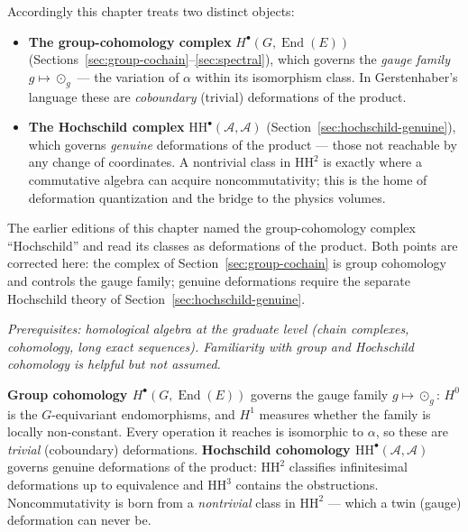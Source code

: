 \documentclass[11pt,a4paper,openany]{book}
\theoremstyle{plain}
\theoremstyle{definition}
\newcommand{\twing}[1]{\odot_{#1}}
\newcommand{\actspace}{E}
\newcommand{\groupG}{G}
\DeclareMathOperator{\End}{End}
\begin{document}
Accordingly this chapter treats two distinct objects:
\begin{itemize}
    \item \textbf{The group-cohomology complex} $H^\bullet(\groupG, \End(\actspace))$ (Sections~\ref{sec:group-cochain}--\ref{sec:spectral}), which governs the \emph{gauge family} $g \mapsto \twing{g}$ --- the variation of $\alpha$ within its isomorphism class. In Gerstenhaber's language these are \emph{coboundary} (trivial) deformations of the product.
    \item \textbf{The Hochschild complex} $\mathrm{HH}^\bullet(\mathcal{A},\mathcal{A})$ (Section~\ref{sec:hochschild-genuine}), which governs \emph{genuine} deformations of the product --- those not reachable by any change of coordinates. A nontrivial class in $\mathrm{HH}^2$ is exactly where a commutative algebra can acquire noncommutativity; this is the home of deformation quantization and the bridge to the physics volumes.
\end{itemize}

The earlier editions of this chapter named the group-cohomology complex ``Hochschild'' and read its classes as deformations of the product. Both points are corrected here: the complex of Section~\ref{sec:group-cochain} is group cohomology and controls the gauge family; genuine deformations require the separate Hochschild theory of Section~\ref{sec:hochschild-genuine}.

\textit{Prerequisites: homological algebra at the graduate level (chain complexes, cohomology, long exact sequences). Familiarity with group and Hochschild cohomology is helpful but not assumed.}

\begin{keyresult}
\textbf{Group cohomology $H^\bullet(\groupG,\End(\actspace))$} governs the gauge family $g\mapsto\twing{g}$: $H^0$ is the $\groupG$-equivariant endomorphisms, and $H^1$ measures whether the family is locally non-constant. Every operation it reaches is isomorphic to $\alpha$, so these are \emph{trivial} (coboundary) deformations. \textbf{Hochschild cohomology $\mathrm{HH}^\bullet(\mathcal{A},\mathcal{A})$} governs genuine deformations of the product: $\mathrm{HH}^2$ classifies infinitesimal deformations up to equivalence and $\mathrm{HH}^3$ contains the obstructions. Noncommutativity is born from a \emph{nontrivial} class in $\mathrm{HH}^2$ --- which a twin (gauge) deformation can never be.
\end{keyresult}
\end{document}
